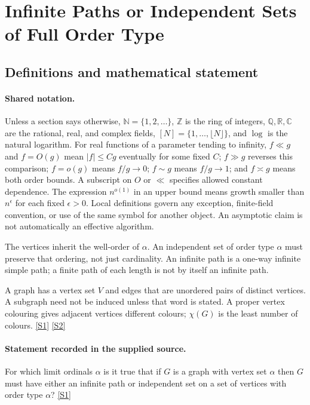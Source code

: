 \documentclass[11pt,a4paper]{article}
\newcommand{\N}{\mathbb{N}}
\newcommand{\Z}{\mathbb{Z}}
\newcommand{\Q}{\mathbb{Q}}
\newcommand{\R}{\mathbb{R}}
\newcommand{\C}{\mathbb{C}}
\newcommand{\sref}[2]{\hyperlink{source:#1:#2}{[S#2]}}
\begin{document}
\section{Infinite Paths or Independent Sets of Full Order Type}\label{statement}


\subsection{Definitions and mathematical statement}

\paragraph{Shared notation.}Unless a section says otherwise, $\N=\{1,2,\ldots\}$,
$\Z$ is the ring of integers, $\Q,\R,\C$ are the rational, real, and complex
fields, $[N]=\{1,\ldots,\lfloor N\rfloor\}$, and $\log$ is the natural
logarithm. For real functions of a parameter tending to infinity,
$f\ll g$ and $f=O(g)$ mean $|f|\leq Cg$ eventually for some fixed $C$;
$f\gg g$ reverses this comparison; $f=o(g)$ means $f/g\to0$;
$f\sim g$ means $f/g\to1$; and $f\asymp g$ means both order bounds.
A subscript on $O$ or $\ll$ specifies allowed constant dependence.
The expression $n^{o(1)}$ in an upper bound means growth smaller than
$n^\epsilon$ for each fixed $\epsilon>0$. Local definitions govern any
exception, finite-field convention, or use of the same symbol for another
object. An asymptotic claim is not automatically an effective algorithm.



The vertices inherit the well-order of $\alpha$. An independent set of order type $\alpha$ must preserve that ordering, not just cardinality. An infinite path is a one-way infinite simple path; a finite path of each length is not by itself an infinite path.

A graph has a vertex set $V$ and edges that are unordered pairs of distinct vertices. A subgraph need not be induced unless that word is stated. A proper vertex colouring gives adjacent vertices different colours; $\chi(G)$ is the least number of colours. \sref{statement}{1} \sref{statement}{2}

\paragraph{Statement recorded in the supplied source.}
For which limit ordinals $\alpha$ is it true that if $G$ is a graph with vertex set $\alpha$ then $G$ must have either an infinite path or independent set on a set of vertices with order type $\alpha$? \sref{statement}{1}
\end{document}
